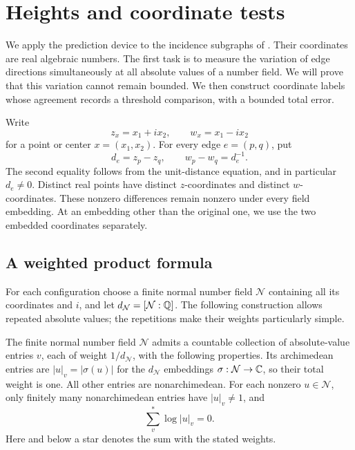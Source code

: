 \section{Heights and coordinate tests}\label{sec:heights}

We apply the prediction device to the incidence subgraphs of
. Their coordinates are real algebraic numbers.
The first task is to measure the variation of edge directions simultaneously
at all absolute values of a number field. We will prove that this variation
cannot remain bounded. We then construct coordinate labels whose agreement
records a threshold comparison, with a bounded total error.

Write
\[
 z_x=x_1+i x_2,\qquad w_x=x_1-i x_2
\]
for a point or center $x=(x_1,x_2)$. For every edge $e=(p,q)$, put
\begin{equation}\label{ht:jumps}
 d_e=z_p-z_q,\qquad w_p-w_q=d_e^{-1}.
\end{equation}
The second equality follows from the unit-distance equation, and in
particular $d_e\ne0$. Distinct real points have distinct $z$-coordinates and
distinct $w$-coordinates. These nonzero differences remain nonzero under
every field embedding. At an embedding other than the original one,
we use the two embedded coordinates separately.

\subsection{A weighted product formula}

For each configuration choose a finite normal number field $\mathcal N$
containing all its coordinates and $i$, and let
$d_{\mathcal N}=[\mathcal N:\mathbb Q]$.
The following construction allows repeated absolute values; the repetitions
make their weights particularly simple.

\begin{lemma}\label{ht:product}
The finite normal number field $\mathcal N$ admits a countable collection
of absolute-value entries $v$, each of weight $1/d_{\mathcal N}$, with
the following properties.
Its archimedean entries are $|u|_v=|\sigma(u)|$ for the $d_{\mathcal N}$ embeddings
$\sigma:\mathcal N\to\mathbb C$, so their total weight is one. All other entries
are nonarchimedean. For each nonzero $u\in\mathcal N$, only finitely many
nonarchimedean entries have $|u|_v\ne1$, and
\begin{equation}\label{ht:product-formula}
 \sum_v^*\log|u|_v=0.
\end{equation}
Here and below a star denotes the sum with the stated weights.
\end{lemma}

